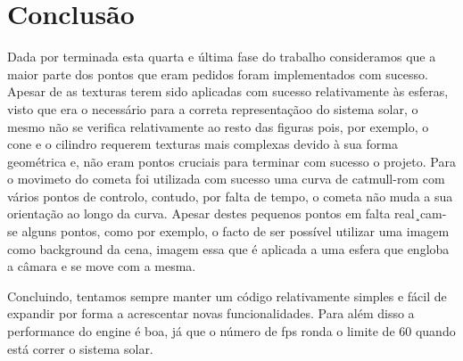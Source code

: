 \chapter{Conclusão}

Dada por terminada esta quarta e última fase do trabalho consideramos que a maior parte dos pontos que eram pedidos foram implementados com sucesso.
Apesar de as texturas terem sido aplicadas com sucesso relativamente às esferas, visto que era o necessário para a correta representaçãoo do sistema solar, o mesmo não se verifica relativamente ao resto das figuras pois, por exemplo, o cone e o cilindro requerem texturas mais complexas devido à sua forma geométrica e, não eram pontos cruciais para terminar com sucesso o projeto.
Para o movimeto do cometa foi utilizada com sucesso uma curva de catmull-rom com vários pontos de controlo, contudo, por falta de tempo, o cometa não muda a sua orientação ao longo da curva.
Apesar destes pequenos pontos em falta real¸cam-se alguns pontos, como por exemplo, o facto de ser possível utilizar uma imagem como background da cena, imagem essa que é aplicada a uma esfera que engloba a câmara e se move com a mesma. 

Concluindo, tentamos sempre manter um código relativamente simples e fácil de expandir por forma a acrescentar novas funcionalidades. Para além disso a performance do engine é boa, já que o número de fps ronda o limite de 60 quando está correr o sistema solar.